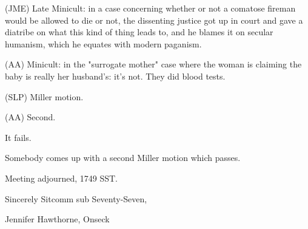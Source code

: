 \documentclass[12pt]{article}
\begin{document}
(JME) Late Minicult: in a case concerning whether or not a comatose fireman would be allowed to die or not, the dissenting justice got up in court and gave a diatribe on what this kind of thing leads to, and he blames it on secular humanism, which he equates with modern paganism.

(AA) Minicult: in the "surrogate mother" case where the woman is claiming the baby is really her husband's: it's not. They did blood tests.

(SLP) Miller motion.

(AA) Second.

It fails.

Somebody comes up with a second Miller motion which passes.

\vspace{12pt}

\noindent
Meeting adjourned, 1749 SST.

\vspace{18pt}

\centerline{Sincerely Sitcomm sub Seventy-Seven,}
\centerline{Jennifer Hawthorne, Onseck}
\end{document}
